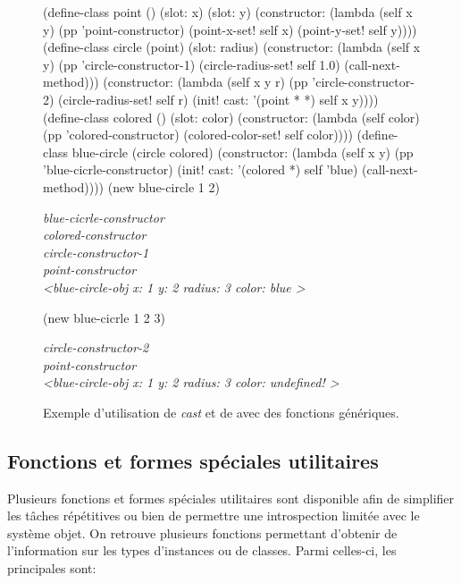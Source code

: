 \documentclass[12pt,oneside,letterpaper,francais]{book}
\newcommand{\scheme}[1]{\selectlanguage{english}{\tt #1}\selectlanguage{french}}
\begin{document}
\begin{figure}[p!]
  \begin{schemecode}
(define-class point () (slot: x) (slot: y)
  (constructor: (lambda (self x y)
                  (pp 'point-constructor)
                  (point-x-set! self x) (point-y-set! self y))))
(define-class circle (point) (slot: radius)
  (constructor: (lambda (self x y)
                  (pp 'circle-constructor-1)
                  (circle-radius-set! self 1.0)
                  (call-next-method)))
  (constructor: (lambda (self x y r)
                  (pp 'circle-constructor-2)
                  (circle-radius-set! self r)
                  (init! cast: '(point * *) self x y))))
(define-class colored () (slot: color)
  (constructor: (lambda (self color)
                  (pp 'colored-constructor)
                  (colored-color-set! self color))))
(define-class blue-circle (circle colored)
  (constructor: (lambda (self x y)
                  (pp 'blue-cicrle-constructor)
                  (init! cast: '(colored *) self 'blue)
                  (call-next-method))))
(new blue-circle 1 2)
  \end{schemecode}
  {{\it
blue-cicrle-constructor\\
colored-constructor\\
circle-constructor-1\\
point-constructor\\
\textless blue-circle-obj x: 1 y: 2 radius: 3 color: blue \textgreater 
  }}
  \begin{schemecode}
    (new blue-cicrle 1 2 3)
  \end{schemecode}
  {{\it
circle-constructor-2\\
point-constructor\\
\textless blue-circle-obj x: 1 y: 2 radius: 3 color: undefined!  \textgreater
  }}
  \caption{Exemple d'utilisation de \textit{cast} et de
    \scheme{call-next-method} avec des fonctions génériques.}
  \label{OO:cast}
\end{figure}


\subsection{Fonctions et formes spéciales utilitaires}

Plusieurs fonctions et formes spéciales utilitaires sont disponible
afin de simplifier les tâches répétitives ou bien de permettre une
introspection limitée avec le système objet. On retrouve plusieurs
fonctions permettant d'obtenir de l'information sur les types
d'instances ou de classes. Parmi celles-ci, les principales sont:
\end{document}
